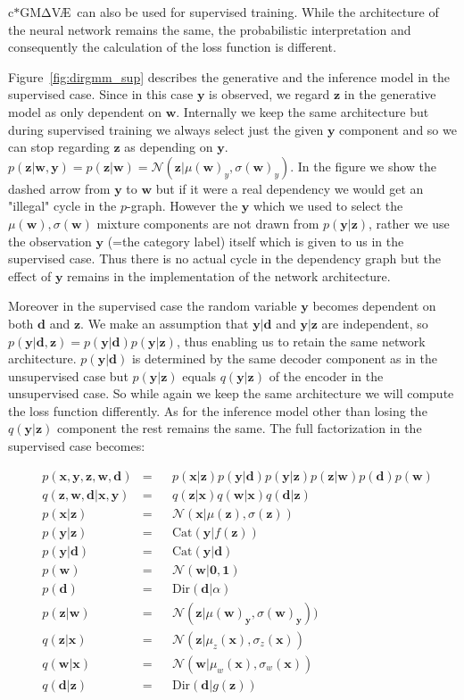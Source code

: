 \documentclass[11pt, a4paper]{report}
\theoremstyle{plain}
\theoremstyle{definition}
\theoremstyle{remark}
\newcommand{\x}{\mathbf{x}}
\newcommand{\z}{\mathbf{z}}
\newcommand{\y}{\mathbf{y}}
\newcommand{\w}{\mathbf{w}}
\newcommand{\dd}{\mathbf{d}}
\newcommand{\NN}{\mathcal{N}}
\newcommand{\bv}[1]{\boldsymbol{#1}}
\newcommand{\gmvae}{c$\ast$GM$\mathrm{\Delta}$V\AE~}
\begin{document}
\gmvae can also be used for supervised training. While the
architecture of the neural network remains the same, the probabilistic
interpretation and consequently the calculation of the loss function is
different.

Figure~\ref{fig:dirgmm_sup} describes the generative and the inference model in
the supervised case.
Since in this case $\y$ is observed, we regard $\z$ in the generative model
as only dependent on $\w$. Internally we keep the same architecture but during
supervised training we always select just the given $\y$ component and so we
can stop regarding $\z$ as depending on $\y$.
$p(\z | \w, \y) = p(\z | \w) = \NN(\z | \mu(\w)_y, \sigma(\w)_y)$.
In the figure we show the dashed arrow from $\y$ to $\w$ but if it were a real
dependency we would get an "illegal" cycle in the $p$-graph. However the $\y$
which we used to select the $\mu(\w), \sigma(\w)$ mixture components are not
drawn from $p(\y | \z)$, rather we use the observation $\y$ (=the category
label) itself which is
given to us in the supervised case. Thus there is no actual cycle in the
dependency graph but the effect of $\y$ remains in the implementation of the
network architecture. 

Moreover in the supervised case the random variable $\y$ becomes dependent on both $\dd$ and $\z$.
We make an assumption that $\y | \dd$ and $\y | \z$ are independent, so
$p(\y | \dd, \z) = p(\y | \dd)p(\y | \z)$, thus enabling us to retain the same 
network architecture. $p(\y | \dd)$ is determined by
the same decoder component as in the unsupervised case but $p(\y | \z)$ equals 
$q(\y | \z)$ of the encoder in the unsupervised case. So while again we keep the same
architecture we will compute the loss function differently.
As for the inference model other than losing the $q(\y | \z)$
component the rest remains the same.
The full factorization in the supervised case becomes:

\begin{equation}
\begin{aligned}
&p(\x, \y, \z, \w, \dd) &=& 
&p(\x | \z) p(\y | \dd) p(\y | \z) p(\z | \w) p(\dd) p(\w) \\
&q(\z, \w, \dd | \x, \y) &=& 
&q(\z | \x) q(\w | \x) q(\dd | \z) \\
&p(\x | \z) &=& & \NN(\x | \mu(\z), \sigma(\z)) \\
&p(\y | \z) &=& &\text{Cat}(\y | f(\z)) \\
&p(\y | \dd) &=& & \text{Cat}(\y | \dd) \\
&p(\w) &=& & \NN(\w | \bv{0},\bv{1}) \\
&p(\dd) &=& & \text{Dir}(\dd | \alpha) \\
&p(\z | \w) &=& & \NN(\z | \mu(\w)_{\y}, \sigma(\w)_{\y})) \\
&q(\z | \x) &=& &\NN(\z | \mu_z(\x), \sigma_z(\x)) \\
&q(\w | \x) &=& &\NN(\w | \mu_w(\x), \sigma_w(\x)) \\
&q(\dd | \z) &=& &\text{Dir}(\dd | g(\z))
\label{eq:gmmfact_supervised}
\end{aligned}
\end{equation}
\end{document}
